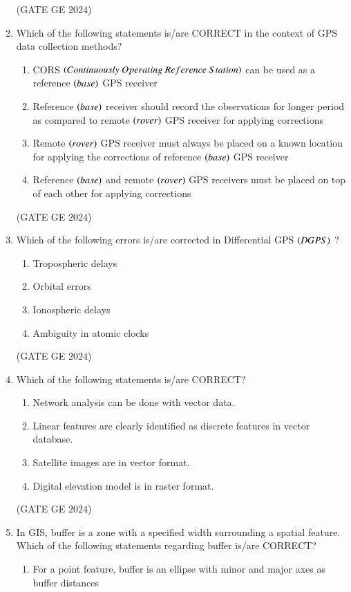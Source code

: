 \documentclass[journal,12pt,onecolumn]{IEEEtran}
\theoremstyle{remark}
\begin{document}
\begin{enumerate}
\begin{enumerate}
\end{enumerate}
\hfill{(GATE GE $2024$)}
\bigskip
\item Which of the following statements is/are CORRECT in the context of GPS data collection methods?
\begin{enumerate}
\item CORS $\brak{Continuously\ Operating\ Reference\ Station}$ can be used as a reference $\left(base\right)$ GPS receiver
\item Reference $\left(base\right)$ receiver should record the observations for longer period as compared to remote $\left(rover\right)$ GPS receiver for applying corrections
\item Remote $\left(rover\right)$ GPS receiver must always be placed on a known location for applying the corrections of reference $\left(base\right)$ GPS receiver
\item Reference $\left(base\right)$ and remote $\left(rover\right)$ GPS receivers must be placed on top of each other for applying corrections
\end{enumerate}
\hfill{(GATE GE $2024$)}
\bigskip
\item Which of the following errors is/are corrected in Differential GPS $\left(DGPS\right)$ ?
\begin{enumerate}
\item Tropospheric delays
\item Orbital errors
\item Ionospheric delays
\item Ambiguity in atomic clocks
\end{enumerate}
\hfill{(GATE GE $2024$)}
\bigskip
\item Which of the following statements is/are CORRECT?
\begin{enumerate}
\item Network analysis can be done with vector data.
\item Linear features are clearly identified as discrete features in vector database.
\item Satellite images are in vector format.
\item Digital elevation model is in raster format.
\end{enumerate}
\hfill{(GATE GE $2024$)}
\bigskip
\item In GIS, buffer is a zone with a specified width surrounding a spatial feature.
Which of the following statements regarding buffer is/are CORRECT?
\begin{enumerate}
\item For a point feature, buffer is an ellipse with minor and major axes as buffer distances

\end{enumerate}
\end{enumerate}
\end{document}
